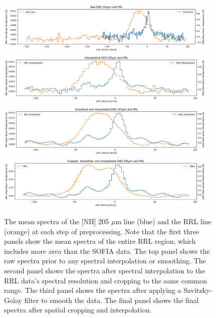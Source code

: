 \begin{figure}
    \centering
    \includegraphics[width=0.95\textwidth]{figs/carina/spec_raw.png}
    \includegraphics[width=0.95\textwidth]{figs/carina/spec_inter.png}
    \includegraphics[width=0.95\textwidth]{figs/carina/spec_smooth.png}    
    \includegraphics[width=0.95\textwidth]{figs/carina/spec_final.png}
    \caption[Mean Spectra of {[}NII{]} 205 $\mu$m and RRL Data During Preprocessing]{
        The mean spectra of the [NII] 205 $\mu$m line (blue) and the RRL line (orange) at each step of preprocessing.
        Note that the first three panels show the mean spectra of the entire RRL region, which includes more area than the SOFIA data.
        The top panel shows the raw spectra prior to any spectral interpolation or smoothing.
        The second panel shows the spectra after spectral interpolation to the RRL data's spectral resolution and cropping to the same common range.
        The third panel shows the spectra after applying a Savitzky-Golay filter to smooth the data.
        The final panel shows the final spectra after spatial cropping and interpolation.
        }
    \label{carina/fig:spectral_means}
\end{figure}

